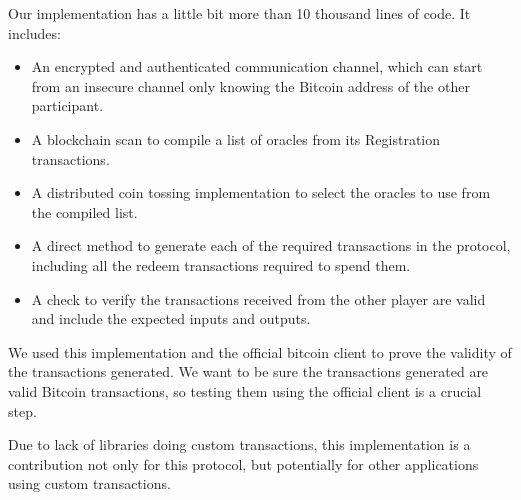 Our implementation has a little bit more than 10 thousand lines of code.
It includes:
\begin{itemize}
\item An encrypted and authenticated communication channel, which can start from
  an insecure channel only knowing the Bitcoin address of the other
  participant.

\item A blockchain scan to compile a list of oracles from its Registration
  transactions.

\item A distributed coin tossing implementation to select the oracles to use
  from the compiled list.

\item A direct method to generate each of the required transactions in the
  protocol, including all the redeem transactions required to spend them.

\item A check to verify the transactions received from the other player are
  valid and include the expected inputs and outputs.
\end{itemize}

We used this implementation and the official bitcoin client to prove the
  validity of the transactions generated.
We want to be sure the transactions generated are valid Bitcoin transactions,
  so testing them using the official client is a crucial step.

Due to lack of libraries doing custom transactions, this implementation is
  a contribution not only for this protocol, but potentially for other
  applications using custom transactions.
